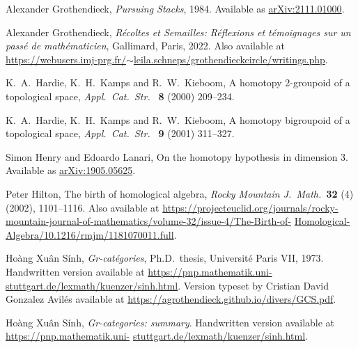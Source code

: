 \documentclass[reqno,12pt]{amsart}
\theoremstyle{definition}
\begin{document}
\begin{thebibliography}{99}
Alexander Grothendieck, \textsl{Pursuing Stacks}, 1984.  Available as
\href{https://arxiv.org/abs/2111.01000}{arXiv:2111.01000}.

Alexander Grothendieck, \textsl{R\'ecoltes et Semailles: R\'eflexions et t\'emoignages sur un pass\'e de math\'ematicien}, Gallimard, Paris, 2022.  Also available at 
\href{https://webusers.imj-prg.fr/~leila.schneps/grothendieckcircle/writings.php}{https://webusers.imj-prg.fr/$\sim$leila.schneps/grothendieckcircle/writings.php}.

K.\ A.\ Hardie, K.\ H.\ Kamps and R.\ W.\ Kieboom, A homotopy 2-groupoid of a topological space, \textsl{Appl.\ Cat.\ Str.\ } \textbf{8} (2000) 209--234.

K.\ A.\ Hardie, K.\ H.\ Kamps and R.\ W.\ Kieboom, A homotopy
bigroupoid of a topological space, \textsl{Appl.\ Cat.\ Str.\ } \textbf{9} 
(2001) 311--327.

Simon Henry and Edoardo Lanari, On the homotopy hypothesis in dimension 3.  Available as \href{https://arxiv.org/abs/1905.05625}{arXiv:1905.05625}.

Peter Hilton, The birth of homological algebra, \textsl{Rocky Mountain J.\ Math.\ }\textbf{32} (4) (2002), 1101--1116.  Also available at \href{https://projecteuclid.org/journals/rocky-mountain-journal-of-mathematics/volume-32/issue-4/The-Birth-of-Homological-Algebra/10.1216/rmjm/1181070011.full}{https://projecteuclid.org/journals/rocky-mountain-journal-of-mathematics/volume-32/issue-4/The-Birth-of-} \hfill \break \href{https://projecteuclid.org/journals/rocky-mountain-journal-of-mathematics/volume-32/issue-4/The-Birth-of-Homological-Algebra/10.1216/rmjm/1181070011.full}{Homological-Algebra/10.1216/rmjm/1181070011.full}.

Ho\`ang Xu\^an S\'inh, \textsl{Gr-cat\'egories}, Ph.D.\ thesis, Universit\'e Paris VII, 1973.  Handwritten version available at
\href{https://pnp.mathematik.uni-stuttgart.de/lexmath/kuenzer/sinh.html}{https://pnp.mathematik.uni-stuttgart.de/lexmath/kuenzer/sinh.html}.  Version typeset by
Cristian David Gonzalez Avil\'es available at \href{https://agrothendieck.github.io/divers/GCS.pdf}{https://agrothendieck.github.io/divers/GCS.pdf}.

Ho\`ang Xu\^an S\'inh, \textsl{Gr-categories: summary}.  Handwritten version available at
 \href{https://pnp.mathematik.uni-stuttgart.de/lexmath/kuenzer/sinh.html}{https://pnp.mathematik.uni-} \hfill \break \href{https://pnp.mathematik.uni-stuttgart.de/lexmath/kuenzer/sinh.html}{stuttgart.de/lexmath/kuenzer/sinh.html}.


\end{thebibliography}
\end{document}
